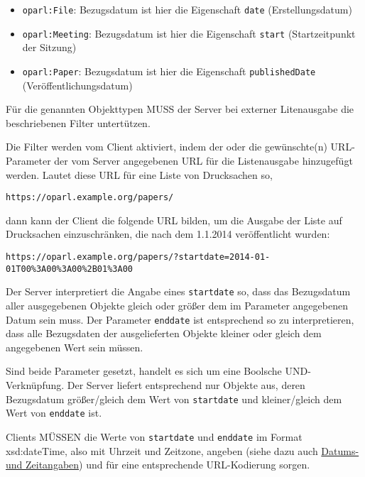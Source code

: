 \documentclass[,a4paper]{article}
\begin{document}
\begin{itemize}
\itemsep1pt\parskip0pt
\item
  \texttt{oparl:File}: Bezugsdatum ist hier die Eigenschaft
  \texttt{date} (Erstellungsdatum)
\item
  \texttt{oparl:Meeting}: Bezugsdatum ist hier die Eigenschaft
  \texttt{start} (Startzeitpunkt der Sitzung)
\item
  \texttt{oparl:Paper}: Bezugsdatum ist hier die Eigenschaft
  \texttt{publishedDate} (Veröffentlichungsdatum)
\end{itemize}

Für die genannten Objekttypen MUSS der Server bei externer Litenausgabe
die beschriebenen Filter untertützen.

Die Filter werden vom Client aktiviert, indem der oder die gewünschte(n)
URL-Parameter der vom Server angegebenen URL für die Listenausgabe
hinzugefügt werden. Lautet diese URL für eine Liste von Drucksachen so,

\begin{verbatim}
https://oparl.example.org/papers/
\end{verbatim}

dann kann der Client die folgende URL bilden, um die Ausgabe der Liste
auf Drucksachen einzuschränken, die nach dem 1.1.2014 veröffentlicht
wurden:

\begin{verbatim}
https://oparl.example.org/papers/?startdate=2014-01-01T00%3A00%3A00%2B01%3A00
\end{verbatim}

Der Server interpretiert die Angabe eines \texttt{startdate} so, dass
das Bezugsdatum aller ausgegebenen Objekte gleich oder größer dem im
Parameter angegebenen Datum sein muss. Der Parameter \texttt{enddate}
ist entsprechend so zu interpretieren, dass alle Bezugsdaten der
ausgelieferten Objekte kleiner oder gleich dem angegebenen Wert sein
müssen.

Sind beide Parameter gesetzt, handelt es sich um eine Boolsche
UND-Verknüpfung. Der Server liefert entsprechend nur Objekte aus, deren
Bezugsdatum größer/gleich dem Wert von \texttt{startdate} und
kleiner/gleich dem Wert von \texttt{enddate} ist.

Clients MÜSSEN die Werte von \texttt{startdate} und \texttt{enddate} im
Format xsd:dateTime, also mit Uhrzeit und Zeitzone, angeben (siehe dazu
auch \hyperref[datumux5fzeit]{Datums- und Zeitangaben}) und für eine
entsprechende URL-Kodierung sorgen.
\end{document}
